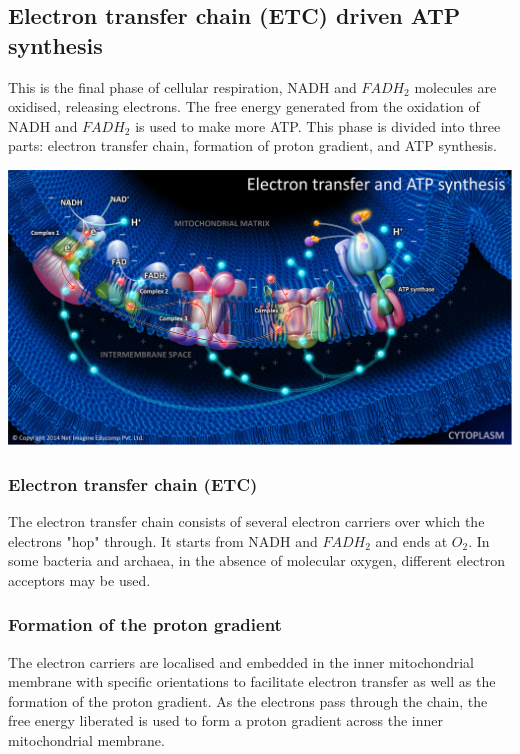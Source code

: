 \documentclass[11pt]{article}
\begin{document}
\subsection{Electron transfer chain (ETC) driven ATP synthesis}
\label{sec:orge73e74a}
This is the final phase of cellular respiration, NADH and \(FADH_2\) molecules are oxidised, releasing electrons. The free energy generated from the oxidation of NADH and \(FADH_2\) is used to make more ATP. This phase is divided into three parts: electron transfer chain, formation of proton gradient, and ATP synthesis.
\begin{center}
\includegraphics[width=.9\linewidth]{./images/electron-transfer-and-atp-synthesis.png}
\end{center}

\subsubsection{Electron transfer chain (ETC)}
\label{sec:orgab679c4}
The electron transfer chain consists of several electron carriers over which the electrons "hop" through. It starts from NADH and \(FADH_2\) and ends at \(O_2\). In some bacteria and archaea, in the absence of molecular oxygen, different electron acceptors may be used.

\subsubsection{Formation of the proton gradient}
\label{sec:orgb21d9e5}
The electron carriers are localised and embedded in the inner mitochondrial membrane with specific orientations to facilitate electron transfer as well as the formation of the proton gradient. As the electrons pass through the chain, the free energy liberated is used to form a proton gradient across the inner mitochondrial membrane.

\newpage
\end{document}
